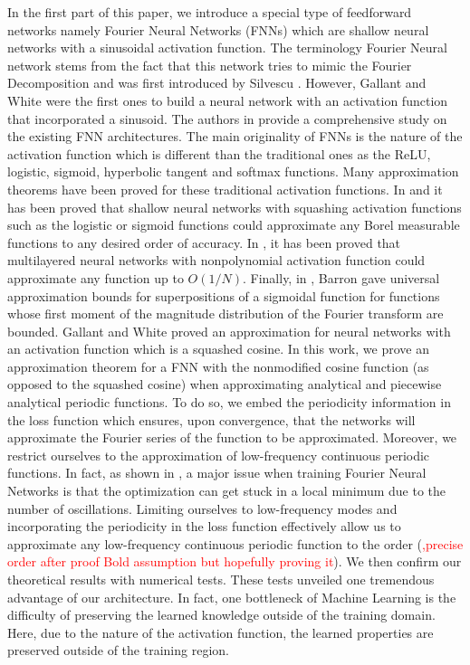 \documentclass[11pt]{article}
\begin{document}
In the first part of this paper, we introduce a special type of feedforward networks namely Fourier Neural Networks (FNNs) which are shallow neural networks with a sinusoidal activation function. The terminology Fourier Neural network stems from the fact that this network tries to mimic the Fourier Decomposition and was first introduced by Silvescu \cite{Silvescu}. However, Gallant and White \cite{Gallant} were the first ones to build a neural network with an activation function that incorporated a sinusoid. The authors in \cite{Zhumekonov2019} provide a comprehensive study on the existing FNN architectures. The main originality of FNNs is the nature of the activation function which is different than the traditional ones as the ReLU, logistic, sigmoid, hyperbolic tangent and softmax functions. Many approximation theorems have been proved for these traditional activation functions. In \cite{Cybenko1992} and \cite{HORNIK1989} it has been proved that shallow neural networks with squashing activation functions such as the logistic or sigmoid functions could approximate any Borel measurable functions to any desired order of accuracy. In \cite{Leshno}, it has been proved that multilayered neural networks with nonpolynomial activation function could approximate any function up to $O(1/N)$. Finally,  in \cite{Barron}, Barron gave universal approximation bounds for superpositions of a sigmoidal function for functions whose first moment of the magnitude distribution of the Fourier transform are bounded. Gallant and White \cite{Gallant} proved an approximation for neural networks with an activation function which is a squashed cosine. In this work, we prove an approximation theorem for a FNN with the nonmodified cosine function (as opposed to the squashed cosine) when approximating analytical and piecewise analytical periodic functions. To do so, we embed the periodicity information in the loss function which ensures, upon convergence, that the networks will approximate the Fourier series of the function to be approximated. Moreover, we restrict ourselves to the approximation of low-frequency continuous periodic functions. In fact, as shown in \cite{Parascandolo2017}, a major issue when training Fourier Neural Networks is that the optimization can get stuck in a local minimum due to the number of oscillations. Limiting ourselves to low-frequency modes and incorporating the periodicity in the loss function effectively allow us to approximate any low-frequency continuous periodic function to the order  (\textcolor{red}{,precise order after proof Bold assumption but hopefully proving it}). We then  confirm our theoretical results with numerical tests. These tests unveiled one tremendous advantage of our architecture. In fact, one bottleneck of Machine Learning is the difficulty of preserving the learned knowledge outside of the training domain. Here, due to the nature of the activation function, the learned properties are preserved outside of the training region. 
\end{document}

